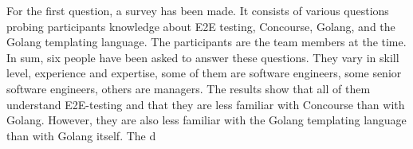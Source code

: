 For the first question, a survey has been made.
It consists of various questions probing participants knowledge about E2E testing, Concourse, Golang, and the Golang templating language.
The participants are the team members at the time.
In sum, six people have been asked to answer these questions.
They vary in skill level, experience and expertise, some of them are software engineers, some senior software engineers, others are managers.
The results show that all of them understand E2E-testing and that they are less familiar with Concourse than with Golang.
However, they are also less familiar with the Golang templating language than with Golang itself.
The d